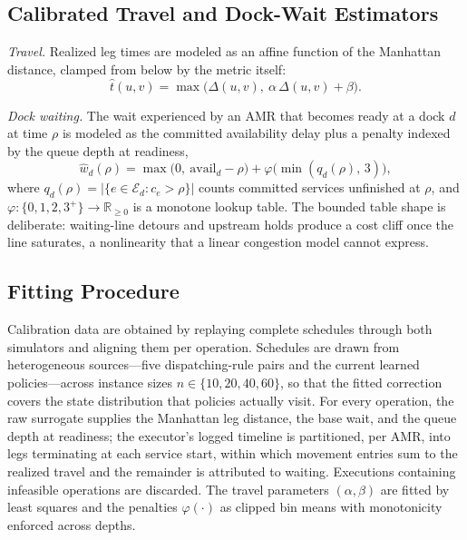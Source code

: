 \subsection{Calibrated Travel and Dock-Wait Estimators}

\emph{Travel.} Realized leg times are modeled as an affine function of
the Manhattan distance, clamped from below by the metric itself:
\begin{equation}
\hat{t}(u,v)=\max\!\big(\Delta(u,v),\ \alpha\,\Delta(u,v)+\beta\big).
\label{eq:travelcal}
\end{equation}

\emph{Dock waiting.} The wait experienced by an AMR that becomes ready
at a dock $d$ at time $\rho$ is modeled as the committed availability
delay plus a penalty indexed by the queue depth at readiness,
\begin{equation}
\hat{w}_d(\rho)=\max\!\big(0,\ \mathrm{avail}_d-\rho\big)
+\varphi\!\big(\min(q_d(\rho),\,3)\big),
\label{eq:waitcal}
\end{equation}
where $q_d(\rho)=|\{e\in\mathcal{E}_d : c_e>\rho\}|$ counts committed
services unfinished at $\rho$, and
$\varphi:\{0,1,2,3^{+}\}\to\mathbb{R}_{\ge0}$ is a monotone lookup
table. The bounded table shape is deliberate: waiting-line detours and
upstream holds produce a cost cliff once the line saturates, a
nonlinearity that a linear congestion model cannot express.

\subsection{Fitting Procedure}

Calibration data are obtained by replaying complete schedules through
both simulators and aligning them per operation. Schedules are drawn
from heterogeneous sources---five dispatching-rule pairs and the
current learned policies---across instance sizes
$n\in\{10,20,40,60\}$, so that the fitted correction covers the state
distribution that policies actually visit. For every operation, the
raw surrogate supplies the Manhattan leg distance, the base wait, and
the queue depth at readiness; the executor's logged timeline is
partitioned, per AMR, into legs terminating at each service start,
within which movement entries sum to the realized travel and the
remainder is attributed to waiting. Executions containing infeasible
operations are discarded. The travel parameters $(\alpha,\beta)$ are
fitted by least squares and the penalties $\varphi(\cdot)$ as clipped
bin means with monotonicity enforced across depths.

